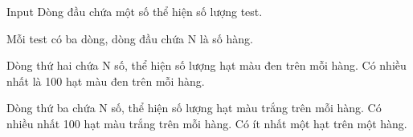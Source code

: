 Input
Dòng đầu chứa một số thể hiện số lượng test.  

   Mỗi test có ba dòng, dòng đầu chứa N là số hàng.  

   Dòng thứ hai chứa N số, thể hiện số lượng hạt màu đen trên mỗi hàng. Có nhiều nhất là 100 hạt màu đen trên mỗi hàng.  

   Dòng thứ ba chứa N số, thể hiện số lượng hạt màu trắng trên mỗi hàng. Có nhiều nhất 100 hạt màu trắng trên mỗi hàng. Có ít nhất một hạt trên một hàng.